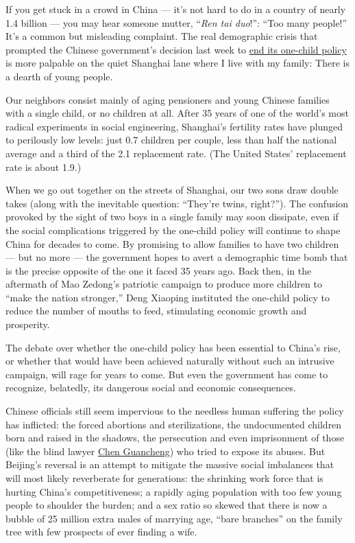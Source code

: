 If you get stuck in a crowd in China --- it's not hard to do in a
country of nearly 1.4 billion --- you may hear someone mutter,
``\emph{Ren tai duo}!'': ``Too many people!'' It's a common but
misleading complaint. The real demographic crisis that prompted the
Chinese government's decision last week to
\href{http://www.nytimes.com/2015/10/30/world/asia/china-end-one-child-policy.html}{end
its one-child policy} is more palpable on the quiet Shanghai lane where
I live with my family: There is a dearth of young people.

Our neighbors consist mainly of aging pensioners and young Chinese
families with a single child, or no children at all. After 35 years of
one of the world's most radical experiments in social engineering,
Shanghai's fertility rates have plunged to perilously low levels: just
0.7 children per couple, less than half the national average and a third
of the 2.1 replacement rate. (The United States' replacement rate is
about 1.9.)

When we go out together on the streets of Shanghai, our two sons draw
double takes (along with the inevitable question: ``They're twins,
right?''). The confusion provoked by the sight of two boys in a single
family may soon dissipate, even if the social complications triggered by
the one-child policy will continue to shape China for decades to come.
By promising to allow families to have two children --- but no more ---
the government hopes to avert a demographic time bomb that is the
precise opposite of the one it faced 35 years ago. Back then, in the
aftermath of Mao Zedong's patriotic campaign to produce more children to
``make the nation stronger,'' Deng Xiaoping instituted the one-child
policy to reduce the number of mouths to feed, stimulating economic
growth and prosperity.

The debate over whether the one-child policy has been essential to
China's rise, or whether that would have been achieved naturally without
such an intrusive campaign, will rage for years to come. But even the
government has come to recognize, belatedly, its dangerous social and
economic consequences.

Chinese officials still seem impervious to the needless human suffering
the policy has inflicted: the forced abortions and sterilizations, the
undocumented children born and raised in the shadows, the persecution
and even imprisonment of those (like the blind lawyer
\href{http://www.nytimes.com/2012/05/20/world/asia/china-dissident-chen-guangcheng-united-states.html}{Chen
Guancheng}) who tried to expose its abuses. But Beijing's reversal is an
attempt to mitigate the massive social imbalances that will most likely
reverberate for generations: the shrinking work force that is hurting
China's competitiveness; a rapidly aging population with too few young
people to shoulder the burden; and a sex ratio so skewed that there is
now a bubble of 25 million extra males of marrying age, ``bare
branches'' on the family tree with few prospects of ever finding a wife.

